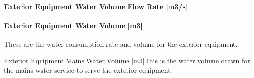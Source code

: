 \paragraph{Exterior Equipment Water Volume Flow Rate {[}m3/s{]}}\label{exterior-equipment-water-volume-flow-rate-m3s}

\paragraph{Exterior Equipment Water Volume {[}m3{]}}\label{exterior-equipment-water-volume-m3}

These are the water consumption rate and volume for the exterior equipment.

Exterior Equipment Mains Water Volume {[}m3{]}This is the water volume drawn for the mains water service to serve the exterior equipment.
